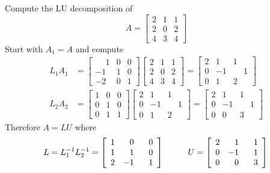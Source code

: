 \begin{example}
Compute the LU decomposition of
$$
A = \begin{bmatrix} 2 & 1 & 1 \\ 2 & 0 & 2 \\ 4 & 3 & 4 \end{bmatrix}
$$
Start with $A_1 = A$ and compute
\begin{align*}
L_1 A_1 &= \begin{bmatrix} \phantom{-}1 & 0 & 0 \\ -1 & 1 & 0 \\ -2 & 0 & 1 \end{bmatrix}
\begin{bmatrix} 2 & 1 & 1 \\ 2 & 0 & 2 \\ 4 & 3 & 4 \end{bmatrix}
=
\left[ \begin{array}{rrr} 2 & 1 & 1 \\ 0 & -1 & \phantom{+}1 \\ 0 & 1 & 2 \end{array} \right] \\
L_2 A_2 &= \begin{bmatrix} 1 & 0 & 0 \\ 0 & 1 & 0 \\ 0 & 1 & 1 \end{bmatrix}
\left[ \begin{array}{rrr} 2 & 1 & 1 \\ 0 & -1 & \phantom{+}1 \\ 0 & 1 & 2 \end{array} \right]
=
\left[ \begin{array}{rrr} 2 & 1 & 1 \\ 0 & -1 & \phantom{+}1 \\ 0 & 0 & 3 \end{array} \right]
\end{align*}
Therefore $A = LU$ where
$$
L = L_1^{-1} L_2^{-1}
=
\left[ \begin{array}{rrr} 1 & 0 & 0 \\ 1 & 1 & 0 \\ 2 & -1 & \phantom{+}1 \end{array} \right]
\hspace{10mm}
U = \left[ \begin{array}{rrr} 2 & 1 & 1 \\ 0 & -1 & \phantom{+}1 \\ 0 & 0 & 3 \end{array} \right] \\
$$
\end{example}

